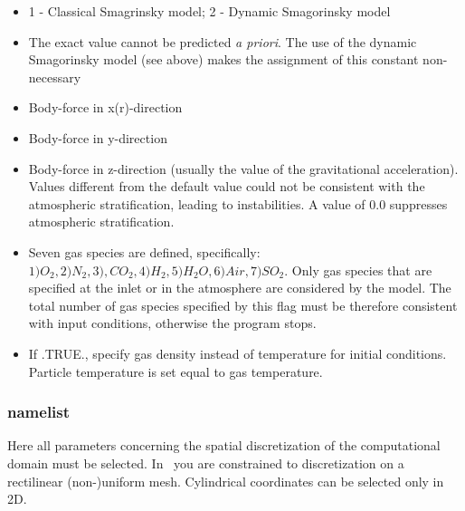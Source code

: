 \begin{itemize}
\item
{}
{1 - Classical Smagrinsky model; 2 - Dynamic Smagorinsky model}

\item
{}
{The exact value cannot be predicted {\it a priori}. The use of the dynamic
Smagorinsky model (see above) makes the assignment of this constant
non-necessary}

\item
{}
{Body-force in x(r)-direction}

\item
{}
{Body-force in y-direction}

\item
{}
{Body-force in z-direction (usually the value of the gravitational acceleration).
Values different from the default value could not be consistent with the 
atmospheric stratification, leading to instabilities. A value of 0.0 
suppresses atmospheric stratification}.

\item
{}
{Seven gas species are defined, specifically: \\
$ 1) O_2, 2) N_2, 3), CO_2, 4) H_2, 5) H_2O, 6) Air, 7) SO_2$. 
Only gas species that are specified at the inlet or in the
atmosphere are considered by the model. The total number of gas 
species specified by this flag must be therefore consistent with 
input conditions, otherwise the program stops.}

\item
{}
{If .TRUE., specify gas density instead of temperature for initial conditions.
Particle temperature is set equal to gas temperature.}

\end{itemize}

\subsubsection{ namelist}
Here all parameters concerning the spatial discretization of the computational
domain must be selected. In \PDAC\ you are constrained to discretization 
on a rectilinear (non-)uniform mesh. Cylindrical coordinates can be
selected only in 2D.

